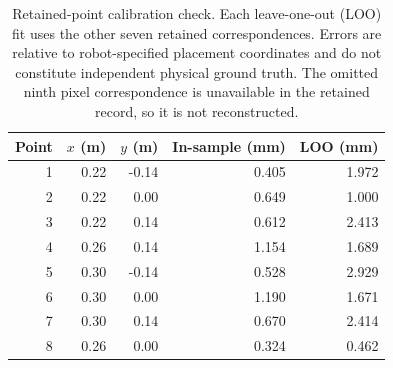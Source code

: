 \begin{table}[H]
\centering
\small
\caption{Retained-point calibration check. Each leave-one-out (LOO) fit uses the other seven retained correspondences. Errors are relative to robot-specified placement coordinates and do not constitute independent physical ground truth. The omitted ninth pixel correspondence is unavailable in the retained record, so it is not reconstructed.}
\label{tab:calibration-loo}
\begin{tabular}{rrr rr}
\toprule
Point & $x$ (m) & $y$ (m) & In-sample (mm) & LOO (mm) \\
\midrule
1 & 0.22 & -0.14 & 0.405 & 1.972 \\
2 & 0.22 & 0.00 & 0.649 & 1.000 \\
3 & 0.22 & 0.14 & 0.612 & 2.413 \\
4 & 0.26 & 0.14 & 1.154 & 1.689 \\
5 & 0.30 & -0.14 & 0.528 & 2.929 \\
6 & 0.30 & 0.00 & 1.190 & 1.671 \\
7 & 0.30 & 0.14 & 0.670 & 2.414 \\
8 & 0.26 & 0.00 & 0.324 & 0.462 \\
\bottomrule
\end{tabular}
\end{table}
